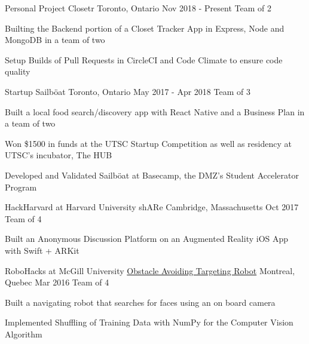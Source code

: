\begin{cventries}
\cventry
    {Personal Project}
    {Closetr}
    {Toronto, Ontario}
    {Nov 2018 - Present}
    {Team of 2}
    {
      \begin{cvitems}
        \item {Builting the Backend portion of a Closet Tracker App in Express, Node and MongoDB in a team of two}
        \item{Setup Builds of Pull Requests in CircleCI and Code Climate to ensure code quality}
      \end{cvitems}
    }
\cventry
  {Startup}
  {Sailböat}
  {Toronto, Ontario}
  {May 2017 - Apr 2018}
  {Team of 3}
  {
    \begin{cvitems}
      \item {Built a local food search/discovery app with React Native and a Business Plan in a team of two}
      \item {Won \$1500 in funds at the UTSC Startup Competition as well as residency at UTSC's incubator, The HUB}
      \item {Developed and Validated Sailböat at Basecamp, the DMZ's Student Accelerator Program}
    \end{cvitems}
  }
\cventry
  {HackHarvard at Harvard University}
  {shARe}
  {Cambridge, Massachusetts}
  {Oct 2017}
  {Team of 4}
  {
    \begin{cvitems}
      \item {Built an Anonymous Discussion Platform on an Augmented Reality iOS App with Swift + ARKit}
    \end{cvitems}
  }
\cventry
  {RoboHacks at McGill University}
  {\href{https://github.com/PhABC/HeadHunterBots}{Obstacle Avoiding Targeting Robot}}
  {Montreal, Quebec}
  {Mar 2016}
  {Team of 4}
  {
    \begin{cvitems}
      \item {Built a navigating robot that searches for faces using an on board camera}
      \item {Implemented Shuffling of Training Data with NumPy for the Computer Vision Algorithm}
    \end{cvitems}
  }
\end{cventries}

